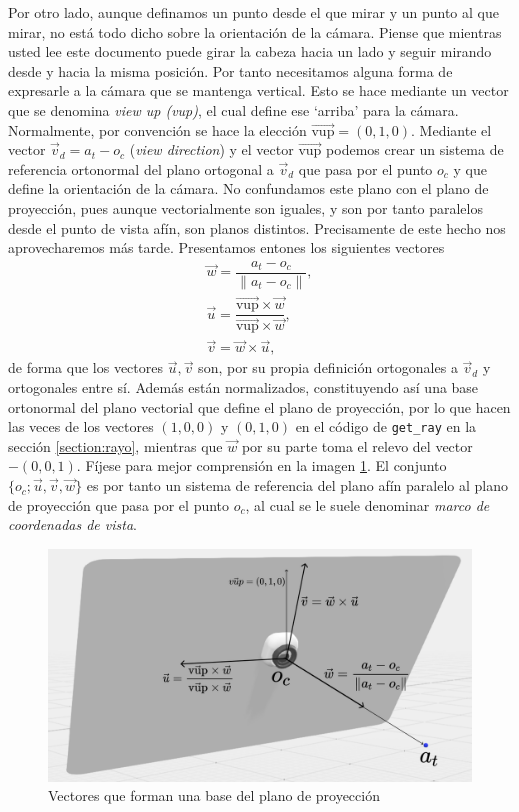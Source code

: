 Por otro lado, aunque definamos un punto desde el que mirar y un punto al que mirar, no está todo dicho sobre la orientación de la cámara. Piense que mientras usted lee este documento puede girar la cabeza hacia un lado y seguir mirando desde y hacia la misma posición. Por tanto necesitamos alguna forma de expresarle a la cámara que se mantenga vertical. Esto se hace mediante un vector que se denomina \textit{view up (vup)}, el cual define ese `arriba' para la cámara. Normalmente, por convención se hace la elección $\overrightarrow{\mathrm{vup}}=(0,1,0)$. Mediante el vector $\vec{v}_d=a_t-o_c$ (\textit{view direction}) y el vector $\overrightarrow{\mathrm{vup}}$ podemos crear un sistema de referencia ortonormal del plano ortogonal a $\vec{v}_d$ que pasa por el punto $o_c$ y que define la orientación de la cámara. No confundamos este plano con el plano de proyección, pues aunque vectorialmente son iguales, y son por tanto paralelos desde el punto de vista afín, son planos distintos. Precisamente de este hecho nos aprovecharemos más tarde. Presentamos entones los siguientes vectores
\begin{eqnarray*}
    \vec w = \dfrac{a_t-o_c}{\|a_t-o_c\|}, \\
    \vec u = \dfrac{\overrightarrow{\mathrm{vup}}\times \vec w}{\overrightarrow{\mathrm{vup}} \times \vec w}, \\
    \vec v = \vec w\times \vec u,
\end{eqnarray*}
de forma que los vectores $\vec u,\vec v$ son, por su propia definición ortogonales a $\vec{v}_d$ y ortogonales entre sí. Además están normalizados, constituyendo así una base ortonormal del plano vectorial que define el plano de proyección, por lo que hacen las veces de los vectores $(1,0,0)$ y $(0,1,0)$ en el código de \verb|get_ray| en la sección \ref{section:rayo}, mientras que $\vec w$ por su parte toma el relevo del vector $-(0,0,1)$. Fíjese para mejor comprensión en la imagen \ref{fig:vectores}. El conjunto $\{o_c; \vec u, \vec v,\vec w\}$ es por tanto un sistema de referencia del plano afín paralelo al plano de proyección que pasa por el punto $o_c$, al cual se le suele denominar \textit{marco de coordenadas de vista}.

\begin{figure} [ht]
    \centering
    \includegraphics[scale = 0.25]{img/C7/plano.png}
    \caption{Vectores que forman una base del plano de proyección}
    \label{fig:vectores}
\end{figure}

